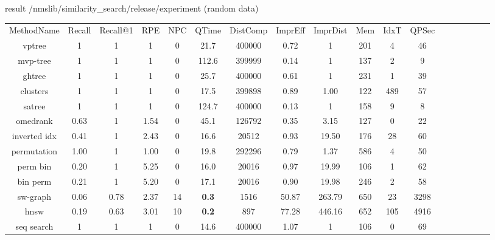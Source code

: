 \documentclass[xcolor=dvipsnames, aspectratio=1610]{beamer}
\newcommand{\alertA}[1]{\color{alertAcolor}#1\color{Black}}
\begin{document}
\begin{frame}[fragile]{result /nmslib/similarity_search/release/experiment (random data)} 
\linespread{1}\tiny{
\begin{minipage}{0.99\textwidth}  
{\fontsize{7}{2} \selectfont
\begin{tabular}{cccccccccccccccccc}
MethodName   & Recall & Recall@1 & RPE         & NPC & QTime & DistComp & ImprEff & ImprDist & Mem & IdxT & QPSec \\
vptree       & 1      & 1        & 1           & 0   & 21.7  & 400000   & 0.72    & 1        & 201 & 4    &  46  \\
mvp-tree     & 1      & 1        & 1           & 0   & 112.6 & 399999   & 0.14    & 1        & 137 & 2    &  9  \\
ghtree       & 1      & 1        & 1           & 0   & 25.7  & 400000   & 0.61    & 1        & 231 & 1    &  39  \\
 clusters    & 1      & 1        & 1           & 0   & 17.5  & 399898   & 0.89    & 1.00     & 122 & 489  &  57  \\
satree       & 1      & 1        & 1           & 0   & 124.7 & 400000   & 0.13    & 1        & 158 & 9    &  8  \\
omedrank     & 0.63   & 1        & 1.54        & 0   & 45.1  & 126792   & 0.35    & 3.15     & 127 & 0    &  22  \\
inverted idx & 0.41   & 1        & 2.43        & 0   & 16.6  & 20512    & 0.93    & 19.50    & 176 & 28   &  60 \\
permutation  & 1.00   & 1        & 1.00        & 0   & 19.8  & 292296   & 0.79    & 1.37     & 586 & 4    &  50 \\
perm bin     & 0.20   & 1        & 5.25        & 0   & 16.0  & 20016    & 0.97    & 19.99    & 106 & 1    &  62  \\
bin perm     & 0.21   & 1        & 5.20        & 0   & 17.1  & 20016    & 0.90    & 19.98    & 246 & 2    &  58  \\
sw-graph     & 0.06   & 0.78     & 2.37        & 14  & \alertA{\bf{0.3}}   & 1516     & 50.87   & 263.79   & 650 & 23   &  3298 \\
hnsw         & 0.19   & 0.63     & 3.01        & 10  & \alertA{\bf{0.2}}   & 897      & 77.28   & 446.16   & 652 & 105  &  4916  \\
seq search   & 1      & 1        & 1           & 0   & 14.6  & 400000   & 1.07    & 1        & 106 & 0    &  69  \\
\end{tabular}
}

\end{minipage}}
\end{frame}
\end{document}
